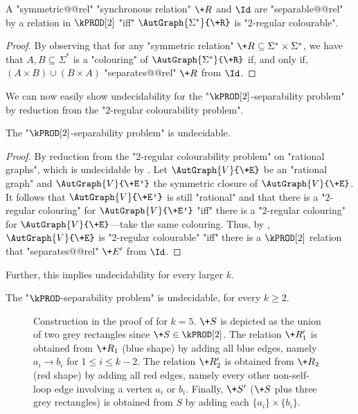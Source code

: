 \begin{corollary}\AP\label{cor:2reg-2prod}
    A "symmetric@@rel" "synchronous relation" $\+R$ and $\Id$ are "separable@@rel" by a relation in $\kPROD[2]$ "iff" $\AutGraph{\Sigma^*}{\+R}$ is "$2$-regular colourable".
\end{corollary}

\begin{proof}
    By observing that for any "symmetric relation" $\+R \subseteq \Sigma^* \times \Sigma^*$, we have that $A,B \subseteq \Sigma^*$ is a "colouring" of $\AutGraph{\Sigma^*}{\+R}$ if, and only if, $(A \times B) \cup (B \times A)$ "separates@@rel" $\+R$ from $\Id$.
\end{proof}

We can now easily show undecidability for the "$\kPROD[2]$-separability problem" by reduction from the "$2$-regular colourability problem".
\begin{lemma}\AP\label{lem:aut-2prod-sep-undec}
    The "$\kPROD[2]$-separability problem" is undecidable.
\end{lemma}
\begin{proof}
    By reduction from the "$2$-regular colourability problem" on "rational graphs", which is undecidable by . Let $\AutGraph{V}{\+E}$ be an "rational graph" and $\AutGraph{V}{\+E'}$ the symmetric closure of $\AutGraph{V}{\+E}$. It follows that $\AutGraph{V}{\+E'}$ is still "rational" and that there is a "$2$-regular colouring" for $\AutGraph{V}{\+E'}$ "iff" there is a "$2$-regular colouring" for $\AutGraph{V}{\+E}$---take the same colouring.
    Thus, by , $\AutGraph{V}{\+E}$ is "$2$-regular colourable" "iff" 
    there is a $\kPROD[2]$ relation that "separates@@rel" $\+E'$ from $\Id$.
\end{proof}

Further, this implies undecidability for every larger $k$.
\begin{theorem}
    \AP\label{thm:kprod-undecidable}
    The "$\kPROD$-separability problem" is undecidable, for every $k \geq 2$.
\end{theorem}

\begin{figure}
    \centering
    \begin{tikzpicture}
        
    \end{tikzpicture}
    \caption{
        \AP\label{fig:2prod-to-kprod}
        Construction in the proof of  for $k = 5$. $\+S$ is depicted as the union of two grey rectangles since $\+S \in \kPROD[2]$.
        The relation $\+R'_1$ is obtained from $\+R_1$ (blue shape) by adding all blue edges,
        namely $a_i \to b_i$ for $1\leq i \leq k-2$. The relation $\+R'_2$ is obtained from $\+R_2$ (red shape) by adding
        all red edges, namely every other non-self-loop edge involving a vertex $a_i$ or $b_i$.
        Finally, $\+S'$ ($\+S$ plus three grey rectangles) is obtained from $S$ by adding
        each $\{a_i\} \times \{b_i\}$.
    }
\end{figure}

